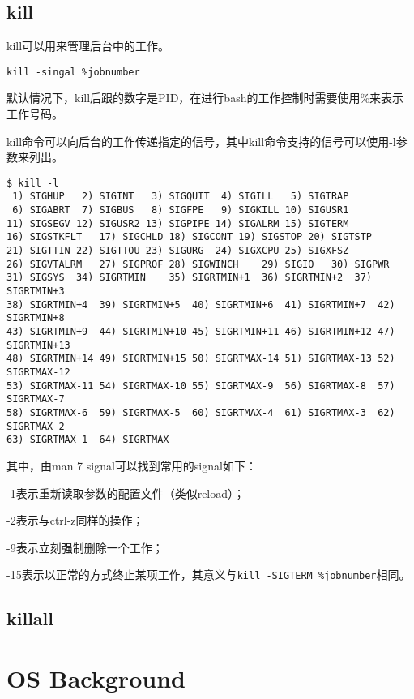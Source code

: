 \section{kill} 

kill可以用来管理后台中的工作。

\begin{verbatim}
kill -singal %jobnumber
\end{verbatim}

默认情况下，kill后跟的数字是PID，在进行bash的工作控制时需要使用\%来表示工作号码。

kill命令可以向后台的工作传递指定的信号，其中kill命令支持的信号可以使用-l参数来列出。

\begin{verbatim}
$ kill -l
 1) SIGHUP	 2) SIGINT	 3) SIGQUIT	 4) SIGILL	 5) SIGTRAP
 6) SIGABRT	 7) SIGBUS	 8) SIGFPE	 9) SIGKILL	10) SIGUSR1
11) SIGSEGV	12) SIGUSR2	13) SIGPIPE	14) SIGALRM	15) SIGTERM
16) SIGSTKFLT	17) SIGCHLD	18) SIGCONT	19) SIGSTOP	20) SIGTSTP
21) SIGTTIN	22) SIGTTOU	23) SIGURG	24) SIGXCPU	25) SIGXFSZ
26) SIGVTALRM	27) SIGPROF	28) SIGWINCH	29) SIGIO	30) SIGPWR
31) SIGSYS	34) SIGRTMIN	35) SIGRTMIN+1	36) SIGRTMIN+2	37) SIGRTMIN+3
38) SIGRTMIN+4	39) SIGRTMIN+5	40) SIGRTMIN+6	41) SIGRTMIN+7	42) SIGRTMIN+8
43) SIGRTMIN+9	44) SIGRTMIN+10	45) SIGRTMIN+11	46) SIGRTMIN+12	47) SIGRTMIN+13
48) SIGRTMIN+14	49) SIGRTMIN+15	50) SIGRTMAX-14	51) SIGRTMAX-13	52) SIGRTMAX-12
53) SIGRTMAX-11	54) SIGRTMAX-10	55) SIGRTMAX-9	56) SIGRTMAX-8	57) SIGRTMAX-7
58) SIGRTMAX-6	59) SIGRTMAX-5	60) SIGRTMAX-4	61) SIGRTMAX-3	62) SIGRTMAX-2
63) SIGRTMAX-1	64) SIGRTMAX	
\end{verbatim}

其中，由man 7 signal可以找到常用的signal如下：

\begin{compactitem}
\item -1表示重新读取参数的配置文件（类似reload）；
\item -2表示与ctrl-z同样的操作；
\item -9表示立刻强制删除一个工作；
\item -15表示以正常的方式终止某项工作，其意义与\texttt{kill -SIGTERM \%jobnumber}相同。
\end{compactitem}



\section{killall} 


\chapter{OS Background}





